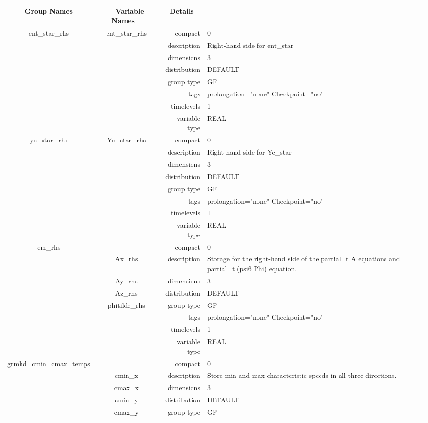 \documentclass{article}
\begin{document}
\begin{tabular*}{150mm}{|c|c@{\extracolsep{\fill}}|rl|} \hline 
~ {\bf Group Names} ~ & ~ {\bf Variable Names} ~  &{\bf Details} ~ & ~ \\ 
\hline 
ent\_star\_rhs & ent\_star\_rhs & compact & 0 \\ 
 &  & description & Right-hand side for ent\_star \\ 
 &  & dimensions & 3 \\ 
 &  & distribution & DEFAULT \\ 
 &  & group type & GF \\ 
 &  & tags & prolongation="none" Checkpoint="no" \\ 
 &  & timelevels & 1 \\ 
 &  & variable type & REAL \\ 
\hline 
ye\_star\_rhs & Ye\_star\_rhs & compact & 0 \\ 
 &  & description & Right-hand side for Ye\_star \\ 
 &  & dimensions & 3 \\ 
 &  & distribution & DEFAULT \\ 
 &  & group type & GF \\ 
 &  & tags & prolongation="none" Checkpoint="no" \\ 
 &  & timelevels & 1 \\ 
 &  & variable type & REAL \\ 
\hline 
em\_rhs &  & compact & 0 \\ 
 & Ax\_rhs & description & Storage for the right-hand side of the partial\_t A equations and partial\_t (psi\^6 Phi) equation. \\ 
 & Ay\_rhs & dimensions & 3 \\ 
 & Az\_rhs & distribution & DEFAULT \\ 
 & phitilde\_rhs & group type & GF \\ 
 &  & tags & prolongation="none" Checkpoint="no" \\ 
 &  & timelevels & 1 \\ 
 &  & variable type & REAL \\ 
\hline 
grmhd\_cmin\_cmax\_temps &  & compact & 0 \\ 
 & cmin\_x & description & Store min and max characteristic speeds in all three directions. \\ 
 & cmax\_x & dimensions & 3 \\ 
 & cmin\_y & distribution & DEFAULT \\ 
 & cmax\_y & group type & GF \\ 

\end{tabular*}
\end{document}
